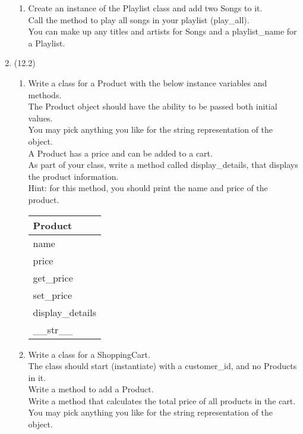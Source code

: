 \documentclass{article}
\begin{document}
\begin{enumerate}
\begin{enumerate}
		\item
			Create an instance of the Playlist class and add two Songs to it.\\
			Call the method to play all songs in your playlist (play\_all).\\
			You can make up any titles and artists for Songs and a playlist\_name for a Playlist.\\
	\end{enumerate}
\pagebreak


\item (12.2)
	\begin{enumerate}
		\item
			Write a class for a Product with the below instance variables and methods.\\ 
			The Product object should have the ability to be passed both initial values.\\  
			You may pick anything you like for the string representation of the object.\\
			A Product has a price and can be added to a cart.\\  
			As part of your class, write a method called display\_details, that displays the product information.\\
			Hint: for this method, you should print the name and price of the product.
			\begin{flushright}
			\begin{tabular}{|l|}
				\hline
				Product\\ \hline
				name\\	price\\	 \hline
				get\_price \\ set\_price \\ display\_details \\ \_\_str\_\_ \\ \hline
			\end{tabular}
			\end{flushright}

		\item
			Write a class for a ShoppingCart. \\
			The class should start (instantiate) with a customer\_id, and no Products in it. \\ 
			Write a method to add a Product.\\
			Write a method that calculates the total price of all products in the cart.\\
			You may pick anything you like for the string representation of the object.
	

\end{enumerate}
\end{enumerate}
\end{document}

